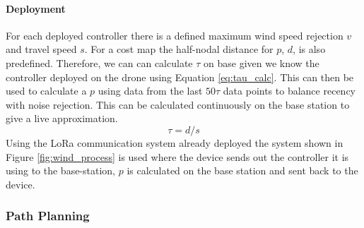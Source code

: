\paragraph{Deployment}
For each deployed controller there is a defined maximum wind speed rejection $v$ and travel speed $s$. For a cost map the half-nodal distance for $p$, $d$, is also predefined. Therefore, we can can calculate $\tau$ on base given we know the controller deployed on the drone using Equation \ref{eq:tau_calc}. This can then be used to calculate a $p$ using data from the last $50\tau$ data points to balance recency with noise rejection. This can be calculated continuously on the base station to give a live approximation.
\begin{equation}\label{eq:tau_calc}
    \tau = d/s
\end{equation}
Using the LoRa communication system already deployed the system shown in Figure \ref{fig:wind_process} is used where the device sends out the controller it is using to the base-station, $p$ is calculated on the base station and sent back to the device. 


\subsubsection{Path Planning}\label{sub_sub_section:tgt_search}
%

\begin{comment}
\paragraph{Exhaustive Search}
The simplest algorithm is the recursive function shown in Algorithm \ref{alg:search}. There are steps taken to increase the efficiency, including pruning lines that already exceed the minimum cost as the cost is monotonic increasing and automatically terminating lines when they can land safely. However, the worst case time complexity remains $O(|V|6^{depth})$ as each node has 6 neighbours that get called recursively. To get guaranteed correct results it would require searching all paths as long as $|V|$ as costs cannot fall below 0 so it is never advantageous to revisit a node. Therefore, the worst case complexity for guaranteed optimal paths is $O(|V|6^{|V|})$. This is not usable for practical applications, therefore it requires a compromise to depth of search, no longer getting optimal path results.
\end{comment}
